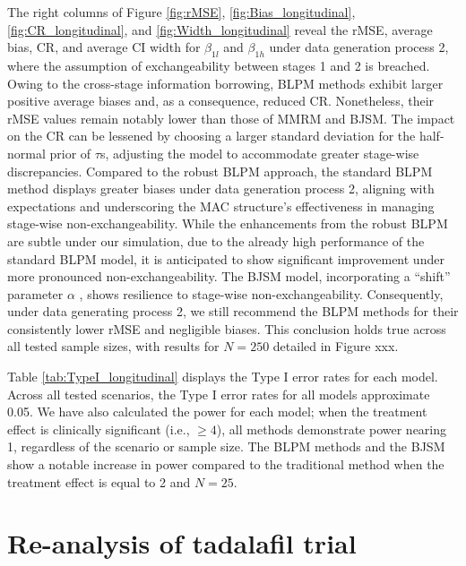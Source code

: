 The right columns of Figure \ref{fig:rMSE}, \ref{fig:Bias_longitudinal}, \ref{fig:CR_longitudinal}, and \ref{fig:Width_longitudinal} reveal the \ac{rMSE}, average bias, \ac{CR}, and average \ac{CI} width for $\beta_{1l}$ and $\beta_{1h}$ under data generation process 2, where the assumption of exchangeability between stages 1 and 2 is breached. Owing to the cross-stage information borrowing, \ac{BLPM} methods exhibit larger positive average biases and, as a consequence, reduced \ac{CR}. Nonetheless, their \ac{rMSE} values remain notably lower than those of \ac{MMRM} and \ac{BJSM}. The impact on the \ac{CR} can be lessened by choosing a larger standard deviation for the half-normal prior of $\tau$s, adjusting the model to accommodate greater stage-wise discrepancies. Compared to the robust \ac{BLPM} approach, the standard \ac{BLPM} method displays greater biases under data generation process 2, aligning with expectations and underscoring the \ac{MAC} structure's effectiveness in managing stage-wise non-exchangeability. While the enhancements from the robust \ac{BLPM} are subtle under our simulation, due to the already high performance of the standard \ac{BLPM} model, it is anticipated to show significant improvement under more pronounced non-exchangeability. The \ac{BJSM} model, incorporating a ``shift” parameter $\alpha$ \citep{fang2023comparing}, shows resilience to stage-wise non-exchangeability. Consequently, under data generating process 2, we still recommend the \ac{BLPM} methods for their consistently lower \ac{rMSE} and negligible biases. This conclusion holds true across all tested sample sizes, with results for $N = 250$ detailed in Figure xxx.

Table \ref{tab:TypeI_longitudinal} displays the Type I error rates for each model. Across all tested scenarios, the Type I error rates for all models approximate 0.05. We have also calculated the power for each model; when the treatment effect is clinically significant (i.e., \(\geqslant 4\)), all methods demonstrate power nearing 1, regardless of the scenario or sample size. The \ac{BLPM} methods and the \ac{BJSM} show a notable increase in power compared to the traditional method when the treatment effect is equal to 2 and \(N = 25\).


\section{Re-analysis of tadalafil trial}
\label{sec:reanalysis}

